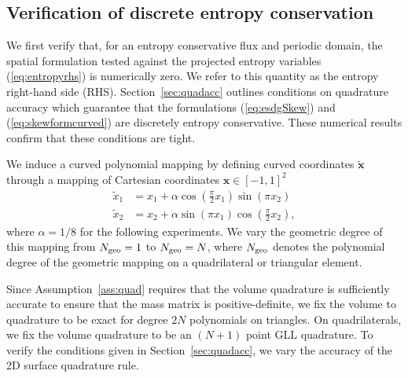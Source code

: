 \documentclass{svjour3}                     %
\renewcommand{\tilde}{\widetilde}
\newcommand{\LRp}[1]{\left( #1 \right)}
\renewcommand{\note}[1]{{\color{blue}{#1}}}
\begin{document}

\subsection{Verification of discrete entropy conservation}

We first verify that, for an entropy conservative flux and periodic domain, the spatial formulation tested against the projected entropy variables (\ref{eq:entropyrhs}) is numerically zero.  We refer to this quantity as the entropy right-hand side (RHS).   Section~\ref{sec:quadacc} outlines conditions on quadrature accuracy which guarantee that the formulations (\ref{eq:esdgSkew}) and (\ref{eq:skewformcurved}) are discretely entropy conservative.  These numerical results confirm that these conditions are tight.  

We induce a curved polynomial mapping by defining curved coordinates $\tilde{\bm{x}}$ through a mapping of Cartesian coordinates $\bm{x} \in [-1,1]^2$ 
\begin{align*}
\tilde{x}_1 &= x_1 + \alpha \cos\LRp{\frac{\pi}{2}x_1}\sin\LRp{\pi x_2}\\
\tilde{x}_2 &= x_2 + \alpha \sin\LRp{{\pi}x_1}\cos\LRp{\frac{\pi}{2} x_2},
\end{align*}
where $\alpha = 1/8$ for the following experiments.  We vary the geometric degree of this mapping from $N_{\rm geo} = 1$ to $N_{\rm geo} = N$, where $N_{\rm geo}$ denotes the polynomial degree of the geometric mapping on a quadrilateral or triangular element.  

Since Assumption~\ref{ass:quad} requires that the volume quadrature is sufficiently accurate to ensure that the mass matrix is positive-definite, we fix the volume to quadrature to be exact for degree $2N$ polynomials on triangles.  On quadrilaterals, we fix the volume quadrature to be an $(N+1)$ point GLL quadrature.  To verify the conditions given in Section~\ref{sec:quadacc}, we vary the accuracy of the 2D surface quadrature rule.  
\end{document}
